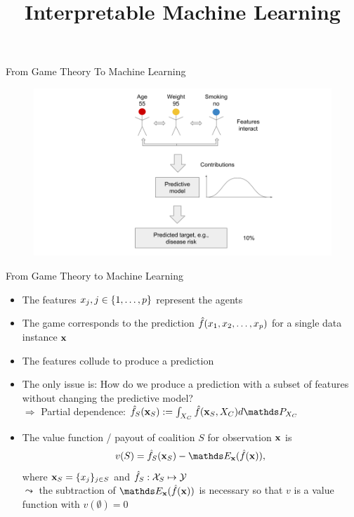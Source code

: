\documentclass[11pt,compress,t,notes=noshow, aspectratio=169, xcolor=table]{beamer}
\title{Interpretable Machine Learning}
\date{}
\begin{document}
\newcommand{\titlefigure}{figure_man/bike-sharing03.png}
\newcommand{\learninggoals}{
\item See model predictions as a cooperative game
\item Transfer the Shapley value concept from game theory to machine learning
}



\begin{vbframe}{From Game Theory To Machine Learning}

\begin{figure}
    \centering
    \includegraphics{figure/Shapley_6.png}
\end{figure}

\end{vbframe}

\begin{vbframe}{From Game Theory to Machine Learning}
\begin{itemize}
    \itemsep1em
    \item The features $x_j, j \in \pset$ represent the agents
    \item The game corresponds to the prediction $\fh(x_1, x_2, \ldots, x_p)$ for a single data instance $\xv$
    \item The features collude to produce a prediction
    \item The only issue is: How do we produce a prediction with a subset of features without changing the predictive model?
    \\ $\Rightarrow$ Partial dependence: $\fh_{S}(\xv_S) := \int_{X_C} \fh(\xv_S, X_C)d \P_{X_C}$
    \item  The value function / payout of coalition $S$ for observation $\xv$ is
    $$v(S) =  \fh_{S} (\xv_S) - \E_{\xv}(\fh(\xv)),$$ 
    where $\xv_S = \{x_j\}_{j \in S}$ and $\fh_S: \Xspace_S \mapsto \Yspace$ \\ $\leadsto$ the subtraction of $\E_{\xv}(\fh(\xv))$ is necessary so that $v$ is a value function with $v(\emptyset) = 0$
\end{itemize}
\end{vbframe}
\end{document}
